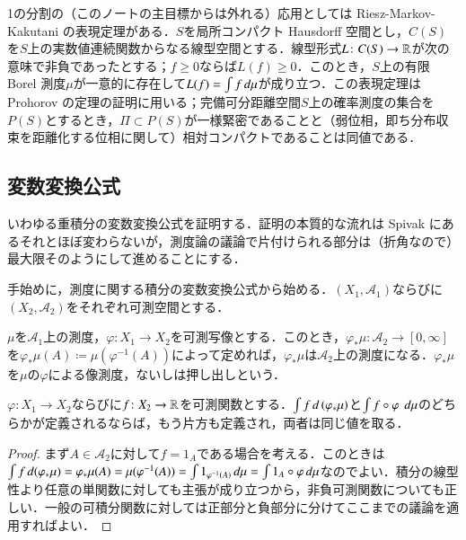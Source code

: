 \begin{que}[**]
1の分割の（このノートの主目標からは外れる）応用としては Riesz-Markov-Kakutani の表現定理がある．$S$を局所コンパクト Hausdorff 空間とし，$C(S)$を$S$上の実数値連続関数からなる線型空間とする．線型形式$L \colon C(S) \to \mathbb{R}$が次の意味で非負であったとする；$f \geq 0$ならば$L(f) \geq 0$．このとき，$S$上の有限 Borel 測度$\mu$が一意的に存在して$L(f) = \int f \mathop{}\!d \mu$が成り立つ．この表現定理は Prohorov の定理の証明に用いる；完備可分距離空間$S$上の確率測度の集合を$P(S)$とするとき，$\Pi \subset P(S)$が一様緊密であることと（弱位相，即ち分布収束を距離化する位相に関して）相対コンパクトであることは同値である．
\end{que}

\subsection{変数変換公式}

いわゆる重積分の変数変換公式を証明する．証明の本質的な流れは Spivak にあるそれとほぼ変わらないが，測度論の議論で片付けられる部分は（折角なので）最大限そのようにして進めることにする．

手始めに，測度に関する積分の変数変換公式から始める．$(X_1, \mathcal{A}_1)$ならびに$(X_2, \mathcal{A}_2)$をそれぞれ可測空間とする．

\begin{defi}
$\mu$を$\mathcal{A}_1$上の測度，$\varphi \colon X_1 \to X_2$を可測写像とする．このとき，$\varphi_* \mu \colon \mathcal{A}_2 \to [0,\infty]$を$\varphi_* \mu (A) \coloneqq \mu(\varphi^{-1}(A))$によって定めれば，$\varphi_* \mu$は$\mathcal{A}_2$上の測度になる．$\varphi_* \mu$を$\mu$の$\varphi$による像測度，ないしは押し出しという．
\end{defi}

\begin{thm}[変数変換公式]$\varphi \colon X_1 \to X_2$ならびに$f \colon X_2 \to \mathbb{R}$を可測関数とする．$\int f \mathop{}\!d\left(\varphi_* \mu \right)$と$\int f \circ \varphi \ \mathop{}\!d \mu$のどちらかが定義されるならば，もう片方も定義され，両者は同じ値を取る．
\end{thm}

\begin{proof}
まず$A \in \mathcal{A}_2$に対して$f = 1_A$である場合を考える．このときは$\int f \mathop{}\!d (\varphi_* \mu) = \varphi_* \mu(A) = \mu(\varphi^{-1}(A)) = \int 1_{\varphi^{-1}(A)} \mathop{}\!d\mu = \int 1_A \circ \varphi \mathop{}\!d\mu$なのでよい．積分の線型性より任意の単関数に対しても主張が成り立つから，非負可測関数についても正しい．一般の可積分関数に対しては正部分と負部分に分けてここまでの議論を適用すればよい．
\end{proof}

